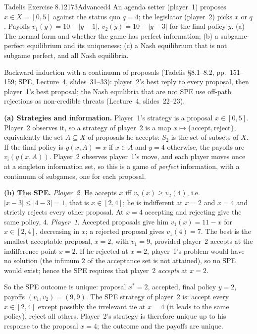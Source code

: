 \begin{exsol}{Tadelis Exercise 8.12}{173}{Advanced}{4}
\asked An agenda setter (player~1) proposes $x \in X = [0,5]$ against the status quo $q = 4$; the
legislator (player~2) picks $x$ or $q$. Payoffs $v_1(y) = 10 - |y-1|$, $v_2(y) = 10 - |y-3|$ for the final policy $y$.
(a) The normal form and whether the game has perfect information; (b) a subgame-perfect equilibrium and
its uniqueness; (c) a Nash equilibrium that is not subgame perfect, and all Nash equilibria.

\method Backward induction with a continuum of proposals (Tadelis \S8.1--8.2, pp.~151--159; SPE, Lecture~4,
slides~31--33): player~2's best reply to every proposal, then player~1's best proposal; the Nash equilibria that are
not SPE use off-path rejections as non-credible threats (Lecture~4, slides~22--23).

\solution
\textbf{(a) Strategies and information.} Player~1's strategy is a proposal $x \in [0,5]$. Player~2 observes it,
so a strategy of player~2 is a map $x \mapsto \{\text{accept}, \text{reject}\}$, equivalently the set
$A \subseteq X$ of proposals he accepts: $S_2$ is the set of subsets of $X$. If the final policy is $y(x, A) = x$ if
$x \in A$ and $y = 4$ otherwise, the payoffs are $v_i(y(x, A))$. Player~2 observes player~1's move, and each
player moves once at a singleton information set, so this is a game of \emph{perfect} information, with a
continuum of subgames, one for each proposal.

\textbf{(b) The SPE.} \emph{Player~2.} He accepts $x$ iff $v_2(x) \ge v_2(4)$, i.e.\ $|x - 3| \le |4 - 3| = 1$,
that is $x \in [2,4]$; he is indifferent at $x = 2$ and $x = 4$ and strictly rejects every other proposal. At
$x = 4$ accepting and rejecting give the same policy, $4$.
\emph{Player~1.} Accepted proposals give him $v_1(x) = 11 - x$ for $x \in [2,4]$, decreasing in $x$; a rejected
proposal gives $v_1(4) = 7$. The best is the smallest acceptable proposal, $x = 2$, with $v_1 = 9$, provided
player~2 accepts at the indifference point $x = 2$. If he rejected at $x = 2$, player~1's problem would have no
solution (the infimum $2$ of the acceptance set is not attained), so no SPE would exist; hence the SPE requires
that player~2 \emph{accepts} at $x = 2$.

So the SPE outcome is unique: proposal $x^* = 2$, accepted, final policy $y = 2$, payoffs
$(v_1,v_2) = (9, 9)$. The SPE strategy of player~2 is: accept every $x \in [2,4]$ except possibly the
irrelevant tie at $x = 4$ (it leads to the same policy), reject all others. Player~2's strategy is therefore unique
up to his response to the proposal $x = 4$; the outcome and the payoffs are unique.


\end{exsol}
